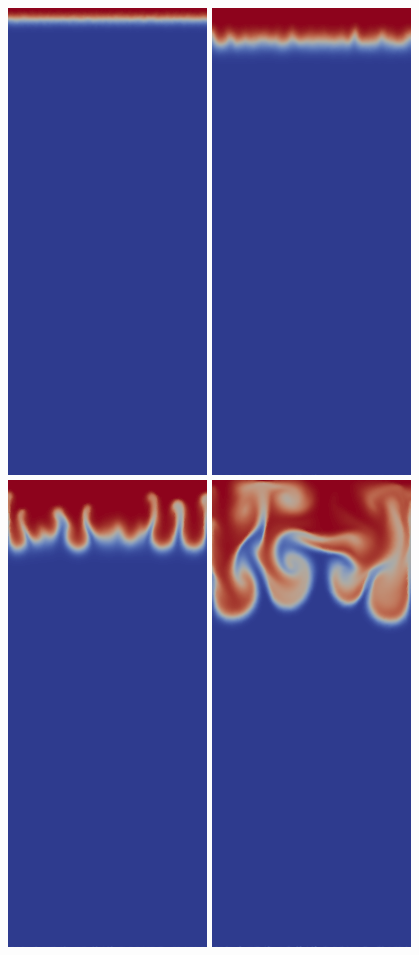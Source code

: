 \begin{figure}[H]
	\centering
	      \includegraphics[width=0.19\columnwidth]{./examples_images/tephra_settling/tephra_influx_1.png}
	      \includegraphics[width=0.19\columnwidth]{./examples_images/tephra_settling/tephra_influx_2.png}
	      \includegraphics[width=0.19\columnwidth]{./examples_images/tephra_settling/tephra_influx_3.png}
	      \includegraphics[width=0.19\columnwidth]{./examples_images/tephra_settling/tephra_influx_4.png}

\end{figure}
